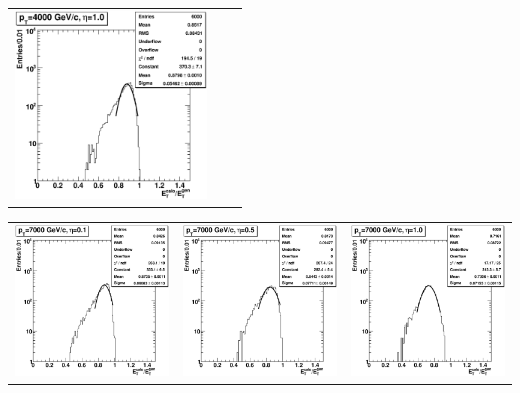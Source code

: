 \documentclass{cmspaper}
\begin{document}
\begin{appendices}
\begin{center}
\begin{tabular}{lll}
 \includegraphics[width=2in]{figs/h_ETRatio_ET_py_fit_corr_eta1.0_pT4000.eps} \\
\end{tabular}
\end{center}
\begin{center}
\begin{tabular}{lll}
 \includegraphics[width=2in]{figs/h_ETRatio_ET_py_fit_corr_eta0.1_pT7000.eps} &
 \includegraphics[width=2in]{figs/h_ETRatio_ET_py_fit_corr_eta0.5_pT7000.eps} &
 \includegraphics[width=2in]{figs/h_ETRatio_ET_py_fit_corr_eta1.0_pT7000.eps} \\
\end{tabular}
\end{center}


\end{appendices}
\end{document}
